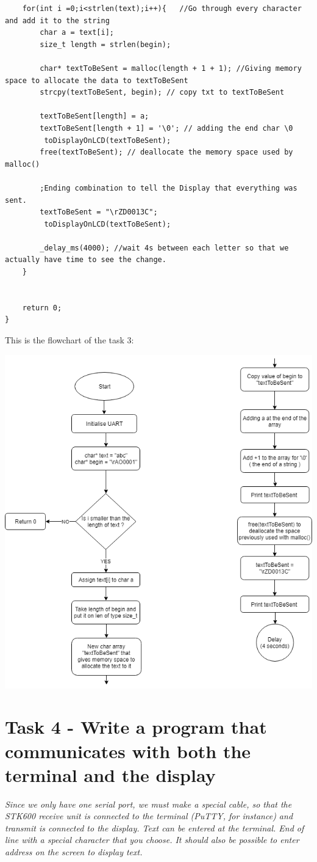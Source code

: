 \documentclass[a4paper,12pt]{article}
\begin{document}
\begin{lstlisting}
	for(int i =0;i<strlen(text);i++){ 	//Go through every character and add it to the string 
		char a = text[i];
		size_t length = strlen(begin);
		
		char* textToBeSent = malloc(length + 1 + 1); //Giving memory space to allocate the data to textToBeSent
		strcpy(textToBeSent, begin); // copy txt to textToBeSent
		
		textToBeSent[length] = a;  
		textToBeSent[length + 1] = '\0'; // adding the end char \0
		 toDisplayOnLCD(textToBeSent); 
		free(textToBeSent); // deallocate the memory space used by malloc()
		
		;Ending combination to tell the Display that everything was sent.
		textToBeSent = "\rZD0013C";
		 toDisplayOnLCD(textToBeSent);

		_delay_ms(4000); //wait 4s between each letter so that we actually have time to see the change.
	}

	
	return 0;
}
\end{lstlisting}
\newpage
This is the flowchart of the task 3:
\begin{center}
\includegraphics[scale=0.7]{img/TASK3.png}
\end{center}
\newpage
\section{Task 4 - Write a program that communicates with both the terminal and the display}
\textit{Since we only have one serial port, we must make a special cable, so that the STK600 receive unit
is connected to the terminal (PuTTY, for instance) and transmit is connected to the display. Text
can be entered at the terminal. End of line with a special character that you choose. It should also
be possible to enter address on the screen to display text.}
\end{document}
